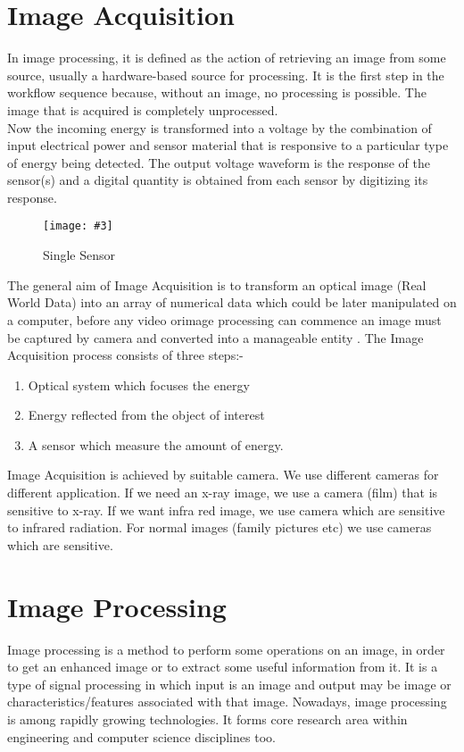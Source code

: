 \documentclass{article}
\newcommand{\addImage}[5]{
    \begin{figure}[#1]
        \centering
        \texttt{[image: \#3]}
        \caption{#4}
        \label{fig:#5}
    \end{figure}
}
\begin{document}
\begin{multicols}{2}
        
        \section{Image Acquisition}
            In image processing, it is defined as the action of retrieving an image from some source, usually a hardware-based source for processing. It is the first step in the workflow sequence because, without an image, no processing is possible. The image that is acquired is completely unprocessed. \cite{buzztech}\\ 
            Now the incoming energy is transformed into a voltage by the combination of input electrical power and sensor material that is responsive to a particular type of energy being detected. The output voltage waveform is the response of the sensor(s) and a digital quantity is obtained from each sensor by digitizing its response. \cite{buzztech}
            \addImage{H}{6cm}{singleSensor.png}{Single Sensor}{single sensor}
            
            The general aim of Image Acquisition is to transform an optical image (Real World Data) into an array of numerical data which could be later manipulated on a computer, before any video orimage processing can commence an image must be captured by camera and converted into a manageable entity \cite{intext}. The Image Acquisition process consists of three steps:-
            \begin{enumerate}
                \item Optical system which focuses the energy
                \item Energy reflected from the object of interest
                \item A sensor which measure the amount of energy.
            \end{enumerate}

            Image Acquisition is achieved by suitable
            camera. We use different cameras for different
            application. If we need an x-ray image, we use a
            camera (film) that is sensitive to x-ray. If we want
            infra red image, we use camera which are sensitive
            to infrared radiation. For normal images (family
            pictures etc) we use cameras which are sensitive. \cite{acqPaper}
        
        \section{Image Processing\cite{sisu}}
            Image processing is a method to perform some operations on an image, in order to get an enhanced image or to extract some useful information from it. It is a type of signal processing in which input is an image and output may be image or characteristics/features associated with that image. Nowadays, image processing is among rapidly growing technologies. It forms core research area within engineering and computer science disciplines too.


\end{multicols}
\end{document}

